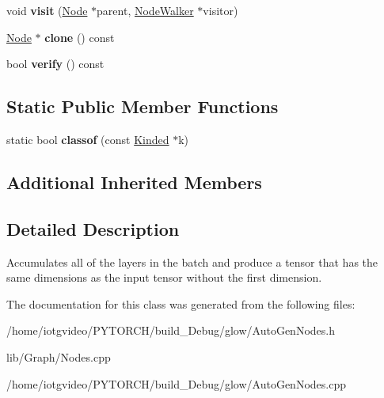 \begin{DoxyCompactItemize}
void {\bfseries visit} (\hyperlink{classglow_1_1_node}{Node} $\ast$parent, \hyperlink{classglow_1_1_node_walker}{Node\+Walker} $\ast$visitor)
\item 
\mbox{\label{classglow_1_1_batched_reduce_add_node_a5576c4f0034a306dab951fefc757e34c}} 
\hyperlink{classglow_1_1_node}{Node} $\ast$ {\bfseries clone} () const
\item 
\mbox{\label{classglow_1_1_batched_reduce_add_node_ab1fb9d4b50fb727a2e4df17c5e5be5c9}} 
bool {\bfseries verify} () const
\end{DoxyCompactItemize}
\subsection*{Static Public Member Functions}
\begin{DoxyCompactItemize}
\item 
\mbox{\label{classglow_1_1_batched_reduce_add_node_a2ba9dd19e41b307291567d0c7c6e87b5}} 
static bool {\bfseries classof} (const \hyperlink{classglow_1_1_kinded}{Kinded} $\ast$k)
\end{DoxyCompactItemize}
\subsection*{Additional Inherited Members}


\subsection{Detailed Description}
Accumulates all of the layers in the batch and produce a tensor that has the same dimensions as the input tensor without the first dimension. 

The documentation for this class was generated from the following files\+:\begin{DoxyCompactItemize}
\item 
/home/iotgvideo/\+P\+Y\+T\+O\+R\+C\+H/build\+\_\+\+Debug/glow/Auto\+Gen\+Nodes.\+h\item 
lib/\+Graph/Nodes.\+cpp\item 
/home/iotgvideo/\+P\+Y\+T\+O\+R\+C\+H/build\+\_\+\+Debug/glow/Auto\+Gen\+Nodes.\+cpp\end{DoxyCompactItemize}
